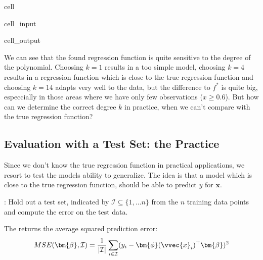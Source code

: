 \documentclass[letterpaper,10pt,english]{jupyterBook}
\begin{document}
\begin{sphinxuseclass}{cell}
\begin{sphinxVerbatimInput}
\begin{sphinxuseclass}{cell_input}
\end{sphinxuseclass}\end{sphinxVerbatimInput}
\begin{sphinxVerbatimOutput}

\begin{sphinxuseclass}{cell_output}
\noindent{}

\end{sphinxuseclass}\end{sphinxVerbatimOutput}

\end{sphinxuseclass}
\sphinxAtStartPar
We can see that the found regression function is quite sensitive to the degree of the polynomial. Choosing \(k=1\) results in a too simple model, choosing \(k=4\) results in a regression function which is close to the true regression function and choosing \(k=14\) adapts very well to the data, but the difference to \(f^*\) is quite big, especcially in those areas where we have only few observations (\(x\geq 0.6\)). But how can we determine the correct degree \(k\) in practice, when we can’t compare with the true regression function?


\subsection{Evaluation with a Test Set: the Practice}
\label{\detokenize{regression_bias_var:evaluation-with-a-test-set-the-practice}}
\sphinxAtStartPar
Since we don’t know the true regression function in practical applications, we resort to test the models ability to generalize.
The idea is that a model which is close to the true regression function, should be able to predict \(y\) for  \(\mathbf{x}\).

\sphinxAtStartPar
{}: Hold out a test set, indicated by \(\mathcal{I}\subseteq\{1,\ldots n\}\) from the \(n\) training data points and compute the error on the test data.

\sphinxAtStartPar
The  returns the average squared prediction error:
\begin{equation*}
\begin{split} MSE(\bm{\beta}, \mathcal{I})= \frac{1}{\lvert \mathcal{I}\rvert}\sum_{i\in\mathcal{I}}(y_i-\bm{\phi}(\vvec{x}_i)^\top \bm{\beta})^2\end{split}
\end{equation*}
\end{document}
